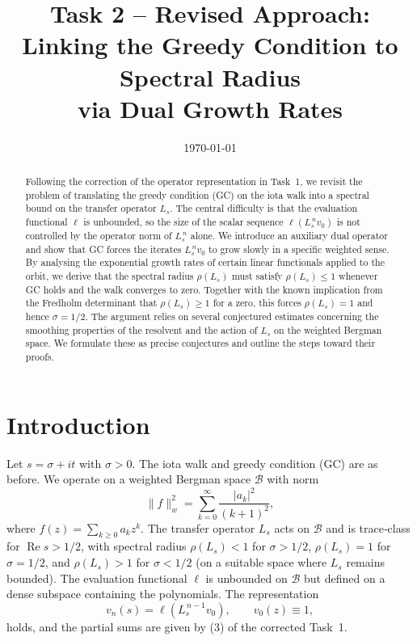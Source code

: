 \documentclass[11pt,a4paper]{article}
\title{\bf Task 2 -- Revised Approach: \\
Linking the Greedy Condition to Spectral Radius\\ via Dual Growth Rates}
\author{}
\date{\today}
\newcommand{\RE}{\operatorname{Re}}
\begin{document}
\maketitle

\begin{abstract}
Following the correction of the operator representation in Task~1, we revisit the problem of translating the greedy condition (GC) on the iota walk into a spectral bound on the transfer operator \(L_s\).  The central difficulty is that the evaluation functional \(\ell\) is unbounded, so the size of the scalar sequence \(\ell(L_s^{\,n} v_0)\) is not controlled by the operator norm of \(L_s^{\,n}\) alone.  We introduce an auxiliary dual operator and show that GC forces the iterates \(L_s^{\,n} v_0\) to grow slowly in a specific weighted sense.  By analysing the exponential growth rates of certain linear functionals applied to the orbit, we derive that the spectral radius \(\rho(L_s)\) must satisfy \(\rho(L_s) \le 1\) whenever GC holds and the walk converges to zero.  Together with the known implication from the Fredholm determinant that \(\rho(L_s) \ge 1\) for a zero, this forces \(\rho(L_s) = 1\) and hence \(\sigma = 1/2\).  The argument relies on several conjectured estimates concerning the smoothing properties of the resolvent and the action of \(L_s\) on the weighted Bergman space.  We formulate these as precise conjectures and outline the steps toward their proofs.
\end{abstract}

\section{Introduction}
Let \(s = \sigma + it\) with \(\sigma > 0\).  The iota walk and greedy condition (GC) are as before.  We operate on a weighted Bergman space \(\mathcal{B}\) with norm
\[
\|f\|_w^2 = \sum_{k=0}^\infty \frac{|a_k|^2}{(k+1)^2},
\]
where \(f(z) = \sum_{k\ge 0} a_k z^k\).  The transfer operator \(L_s\) acts on \(\mathcal{B}\) and is trace‑class for \(\RE s > 1/2\), with spectral radius \(\rho(L_s) < 1\) for \(\sigma > 1/2\), \(\rho(L_s) = 1\) for \(\sigma = 1/2\), and \(\rho(L_s) > 1\) for \(\sigma < 1/2\) (on a suitable space where \(L_s\) remains bounded).  The evaluation functional \(\ell\) is unbounded on \(\mathcal{B}\) but defined on a dense subspace containing the polynomials.  The representation
\[
v_n(s) = \ell( L_s^{\,n-1} v_0 ), \qquad v_0(z) \equiv 1,
\]
holds, and the partial sums are given by (3) of the corrected Task~1.
\end{document}

